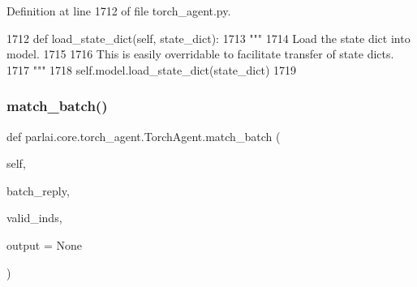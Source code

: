 Definition at line 1712 of file torch\+\_\+agent.\+py.


\begin{DoxyCode}
1712     \textcolor{keyword}{def }load\_state\_dict(self, state\_dict):
1713         \textcolor{stringliteral}{"""}
1714 \textcolor{stringliteral}{        Load the state dict into model.}
1715 \textcolor{stringliteral}{}
1716 \textcolor{stringliteral}{        This is easily overridable to facilitate transfer of state dicts.}
1717 \textcolor{stringliteral}{        """}
1718         self.model.load\_state\_dict(state\_dict)
1719 
\end{DoxyCode}
\mbox{\label{classparlai_1_1core_1_1torch__agent_1_1TorchAgent_aba56b961d929e5c5b5da9cf8bd331502}} 
\subsubsection{\texorpdfstring{match\+\_\+batch()}{match\_batch()}}
{\footnotesize\ttfamily def parlai.\+core.\+torch\+\_\+agent.\+Torch\+Agent.\+match\+\_\+batch (\begin{DoxyParamCaption}\item[{}]{self,  }\item[{}]{batch\+\_\+reply,  }\item[{}]{valid\+\_\+inds,  }\item[{}]{output = {\ttfamily None} }\end{DoxyParamCaption})}

